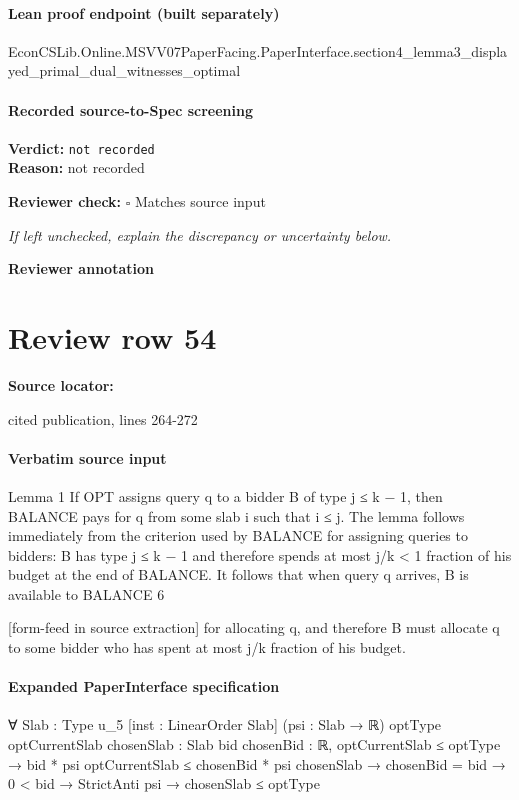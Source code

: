 \documentclass[10pt]{article}
\newcommand{\reviewerbox}{%
  \par\noindent\fbox{\parbox{0.96\linewidth}{\rule{0pt}{0.38in}}}\par
}
\newcommand{\reviewmatch}[1]{%
  \par\noindent\textbf{Reviewer check:} $\square$\; #1\par
  \noindent\emph{If left unchecked, explain the discrepancy or uncertainty below.}\par
}
\begin{document}
\paragraph{Lean proof endpoint (built separately)}\begin{ReviewVerbatim}
EconCSLib.Online.MSVV07PaperFacing.PaperInterface.section4_lemma3_displayed_primal_dual_witnesses_optimal
\end{ReviewVerbatim}

\paragraph{Recorded source-to-Spec screening}
\textbf{Verdict:} \texttt{not recorded}
\\
\textbf{Reason:} not recorded
\reviewmatch{Matches source input}
\noindent\textbf{Reviewer annotation}\par
\reviewerbox
\clearpage
\hypertarget{source-claim-dfccb19a7f8aa7cf}{}
\section*{Review row 54}
\textbf{Source locator:} {\footnotesize\raggedright cited publication, lines 264-\allowbreak{}272\par}
\paragraph{Verbatim source input}
\begin{ReviewVerbatim}
Lemma 1 If OPT assigns query q to a bidder B of type j ≤ k − 1, then BALANCE pays for
q from some slab i such that i ≤ j.
The lemma follows immediately from the criterion used by BALANCE for assigning queries
to bidders: B has type j ≤ k − 1 and therefore spends at most j/k < 1 fraction of his budget
at the end of BALANCE. It follows that when query q arrives, B is available to BALANCE
6


[form-feed in source extraction]
for allocating q, and therefore B must allocate q to some bidder who has spent at most j/k
fraction of his budget.
\end{ReviewVerbatim}


\paragraph{Expanded PaperInterface specification}
\begin{ReviewVerbatim}
∀ {Slab : Type u_5} [inst : LinearOrder Slab] (psi : Slab → ℝ) {optType optCurrentSlab chosenSlab : Slab}
  {bid chosenBid : ℝ},
  optCurrentSlab ≤ optType →
    bid * psi optCurrentSlab ≤ chosenBid * psi chosenSlab →
      chosenBid = bid → 0 < bid → StrictAnti psi → chosenSlab ≤ optType
\end{ReviewVerbatim}
\end{document}

